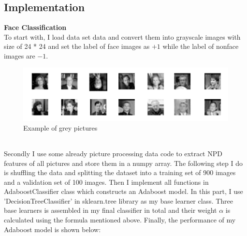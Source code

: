 \documentclass[journal, a4paper]{IEEEtran}
\begin{document}
\subsection{Implementation}
\centering \textbf{Face Classification}\\
To start with, I load data set data and convert them into grayscale images with size of 24 * 24 and set the label of face images as $+1$ while the label of nonface images are $-1$.
\begin{figure}[!hbt]
	\begin{center}
	\includegraphics[width=\columnwidth]{photo_example.png}
	\caption{Example of grey pictures}
	\label{fig2}
	\end{center}
\end{figure}\\
Secondly I use some already picture processing data code to extract NPD features of all pictures and store them in a numpy array. The following step I do is shuffling the data and splitting the dataset into a training set of 900 images and a validation set of 100 images. Then I implement all functions in AdaboostClassifier class which constructs an Adaboost model. In this part, I use 'DecisionTreeClassifier' in sklearn.tree library as my base learner class. Three base learners is assembled in my final classifier in total and their weight $\alpha$ is calculated using the formula mentioned above. Finally, the performance of my Adaboost model is shown below:
\end{document}
